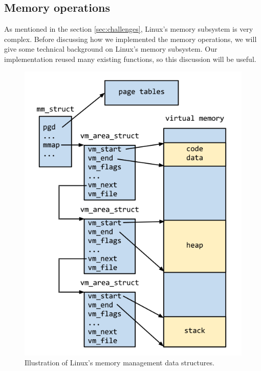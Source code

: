 \begin{itemize}
\subsection{Memory operations}

\label{sec:memop}

As mentioned in the section \ref{sec:challenges}, Linux's memory subsystem is
very complex. Before discussing how we implemented the memory operations,
we will give some technical background on Linux's memory subsystem. Our
implementation reused many existing functions, so this discussion will be
useful.

\begin{figure}
\includegraphics[scale=.42]{mm_struct.png}
\caption{Illustration of Linux's memory management data structures.}
\label{fig:mmstruct}
\end{figure}


\end{itemize}
